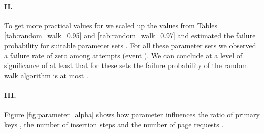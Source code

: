 \let\accentvec\vec \documentclass{llncs}
\begin{document}
 
\begin{table}[!ht]
\centering
{}
\vspace{0.3cm}
\caption{\label{tab:random_walk_0.97}Characteristics of Algorithm \ref{algo:random_walk} for .  .}
\end{table}


\paragraph{II.}To get more practical values for  we scaled up the values  from Tables \ref{tab:random_walk_0.95} and \ref{tab:random_walk_0.97} and {estimated the failure probability} for suitable parameter sets .
For all these parameter sets we observed a failure rate of zero among  attempts (event ). We can conclude at a level of significance of at least  that for these sets the failure probability of the random walk algorithm is at most .

\paragraph{III.}Figure \ref{fig:parameter_alpha} shows how parameter  influences the 
ratio of primary keys , the number of insertion steps  and the number of page requests .
\end{document}
